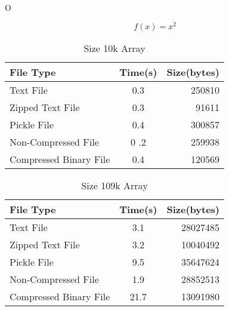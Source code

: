 O%







\begin{equation*}
    f(x) = x^2
\end{equation*}











\begin{table}[h!]
    \begin{center}
        \caption{Size 10k Array}
        \begin{tabular}{l|c|r}
            File Type & Time(s) & Size(bytes)\\
            \hline
            Text File & 0.3 & 250810\\
            \hline
            Zipped Text File & 0.3 & 91611\\
            \hline
            Pickle File &0.4 & 300857\\
            \hline
            Non-Compressed File &0 .2 & 259938\\
            \hline
            Compressed Binary File &0.4 & 120569\\   
        \end{tabular}
    \end{center}
\end{table}


\begin{table}[h!]
    \begin{center}
        \caption{Size 109k Array}
        \begin{tabular}{l|c|r}
            File Type & Time(s) & Size(bytes)\\
            \hline
            Text File &3.1 & 28027485\\
            \hline
             Zipped Text File & 3.2 & 10040492\\
            \hline
            Pickle File & 9.5 & 35647624\\  
            \hline
            Non-Compressed File & 1.9 & 28852513\\
            \hline
            Compressed Binary File & 21.7 & 13091980\\ 
        \end{tabular}
    \end{center}
\end{table}


